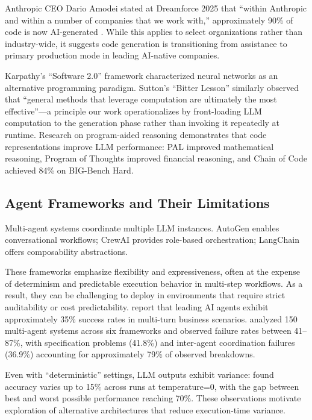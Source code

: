 \documentclass[11pt]{article}
\begin{document}
Anthropic CEO Dario Amodei stated at Dreamforce 2025 that ``within Anthropic and within a number of companies that we work with,'' approximately 90\% of code is now AI-generated \citep{amodei2025dreamforce}. While this applies to select organizations rather than industry-wide, it suggests code generation is transitioning from assistance to primary production mode in leading AI-native companies.

Karpathy's ``Software 2.0'' framework \citep{karpathy2017software2} characterized neural networks as an alternative programming paradigm. Sutton's ``Bitter Lesson'' \citep{sutton2019bitter} similarly observed that ``general methods that leverage computation are ultimately the most effective''---a principle our work operationalizes by front-loading LLM computation to the generation phase rather than invoking it repeatedly at runtime. Research on program-aided reasoning demonstrates that code representations improve LLM performance: PAL \citep{gao2023pal} improved mathematical reasoning, Program of Thoughts \citep{chen2023pot} improved financial reasoning, and Chain of Code \citep{li2024chainofcode} achieved 84\% on BIG-Bench Hard.

\subsection{Agent Frameworks and Their Limitations}

Multi-agent systems coordinate multiple LLM instances. AutoGen \citep{autogen2024} enables conversational workflows; CrewAI \citep{crewai2024} provides role-based orchestration; LangChain \citep{langchain2022} offers composability abstractions.

These frameworks emphasize flexibility and expressiveness, often at the expense of determinism and predictable execution behavior in multi-step workflows. As a result, they can be challenging to deploy in environments that require strict auditability or cost predictability. \citet{salesforce2025agents} report that leading AI agents exhibit approximately 35\% success rates in multi-turn business scenarios. \citet{cemri2025multiagent} analyzed 150 multi-agent systems across six frameworks and observed failure rates between 41--87\%, with specification problems (41.8\%) and inter-agent coordination failures (36.9\%) accounting for approximately 79\% of observed breakdowns.

Even with ``deterministic'' settings, LLM outputs exhibit variance: \citet{atil2024nondeterminism} found accuracy varies up to 15\% across runs at temperature=0, with the gap between best and worst possible performance reaching 70\%. These observations motivate exploration of alternative architectures that reduce execution-time variance.
\end{document}
